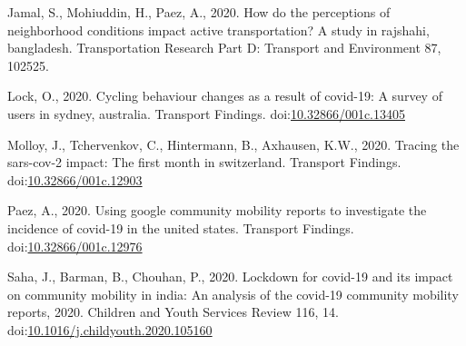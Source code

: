 \documentclass[]{elsarticle} %
\begin{document}
\leavevmode\hypertarget{ref-Jamal2020perceptions}{}%
Jamal, S., Mohiuddin, H., Paez, A., 2020. How do the perceptions of
neighborhood conditions impact active transportation? A study in
rajshahi, bangladesh. Transportation Research Part D: Transport and
Environment 87, 102525.

\leavevmode\hypertarget{ref-Lock2020cycling}{}%
Lock, O., 2020. Cycling behaviour changes as a result of covid-19: A
survey of users in sydney, australia. Transport Findings.
doi:\href{https://doi.org/10.32866/001c.13405}{10.32866/001c.13405}

\leavevmode\hypertarget{ref-Molloy2020tracing}{}%
Molloy, J., Tchervenkov, C., Hintermann, B., Axhausen, K.W., 2020.
Tracing the sars-cov-2 impact: The first month in switzerland. Transport
Findings.
doi:\href{https://doi.org/10.32866/001c.12903}{10.32866/001c.12903}

\leavevmode\hypertarget{ref-Paez2020using}{}%
Paez, A., 2020. Using google community mobility reports to investigate
the incidence of covid-19 in the united states. Transport Findings.
doi:\href{https://doi.org/10.32866/001c.12976}{10.32866/001c.12976}

\leavevmode\hypertarget{ref-Saha2020lockdown}{}%
Saha, J., Barman, B., Chouhan, P., 2020. Lockdown for covid-19 and its
impact on community mobility in india: An analysis of the covid-19
community mobility reports, 2020. Children and Youth Services Review
116, 14.
doi:\href{https://doi.org/10.1016/j.childyouth.2020.105160}{10.1016/j.childyouth.2020.105160}
\end{document}
